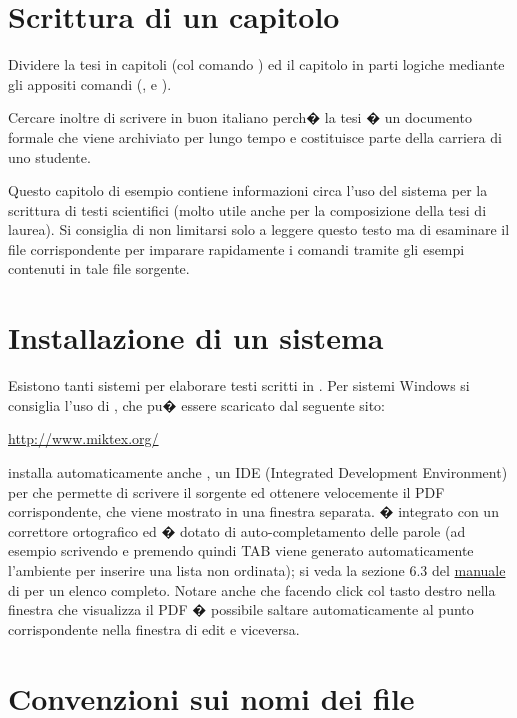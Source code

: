 
\section{Scrittura di un capitolo}

Dividere la tesi in capitoli (col comando ) ed il capitolo in parti logiche mediante gli appositi comandi (,  e ).

Cercare inoltre di scrivere in  buon italiano perch� la tesi � un documento formale che viene archiviato per lungo tempo e costituisce parte della carriera di uno studente.

Questo capitolo di esempio contiene informazioni circa l'uso del sistema \ltx per la scrittura di testi scientifici (molto utile anche per la composizione della tesi di laurea).
Si consiglia di non limitarsi solo a leggere questo testo ma di esaminare il file   corrispondente per imparare rapidamente i comandi \ltx tramite gli esempi contenuti in tale file sorgente.

\section{Installazione di un sistema \ltx}

Esistono tanti sistemi per elaborare testi scritti in \ltx. Per sistemi Windows si consiglia l'uso di \mik, che pu� essere scaricato dal seguente sito:

\url{http://www.miktex.org/}

\mik installa automaticamente anche \txw, un IDE (Integrated Development Environment) per \ltx che permette di scrivere il sorgente ed ottenere velocemente il PDF corrispondente, che viene mostrato in una finestra separata. \txw � integrato con un correttore ortografico ed � dotato di auto-completamento delle parole (ad esempio scrivendo  e premendo quindi TAB viene generato automaticamente l'ambiente  per inserire una lista non ordinata); si veda la sezione 6.3 del \href{http://www.leliseron.org/texworks/}{manuale} di \txw per un elenco completo.
Notare anche che facendo click col tasto destro nella finestra che visualizza il PDF � possibile saltare automaticamente al punto corrispondente nella finestra di edit e viceversa.

\section{Convenzioni sui nomi dei file}

